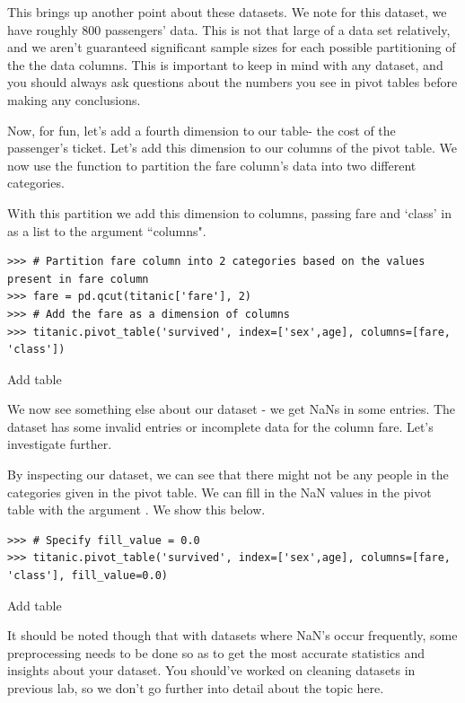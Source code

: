 This brings up another point about these datasets. We note for this dataset, we have roughly 800 passengers' data. This is not that large of a data set relatively, and we aren't guaranteed significant sample sizes for each possible partitioning of the the data columns. This is important to keep in mind with any dataset, and you should always ask questions about the numbers you see in pivot tables before making any conclusions.

Now, for fun, let's add a fourth dimension to our table- the cost of the passenger's ticket. Let's add this dimension to our columns of the pivot table. We now use the function  to partition the fare column's data into two different categories.

With this partition we add this dimension to columns, passing fare and `class' in as a list to the argument ``columns".

\begin{lstlisting}
>>> # Partition fare column into 2 categories based on the values present in fare column
>>> fare = pd.qcut(titanic['fare'], 2)
>>> # Add the fare as a dimension of columns
>>> titanic.pivot_table('survived', index=['sex',age], columns=[fare, 'class'])
\end{lstlisting}

Add table

We now see something else about our dataset - we get NaNs in some entries. The dataset has some invalid entries or incomplete data for the column fare. Let's investigate further.

By inspecting our dataset, we can see that there might not be any people in the categories given in the pivot table. We can fill in the NaN values in the pivot table with the argument . We show this below.

\begin{lstlisting}
>>> # Specify fill_value = 0.0
>>> titanic.pivot_table('survived', index=['sex',age], columns=[fare, 'class'], fill_value=0.0)
\end{lstlisting}

Add table

It should be noted though that with datasets where NaN's occur frequently, some preprocessing needs to be done so as to get the most accurate statistics and insights about your dataset. You should've worked on cleaning datasets in previous lab, so we don't go further into detail about the topic here.

